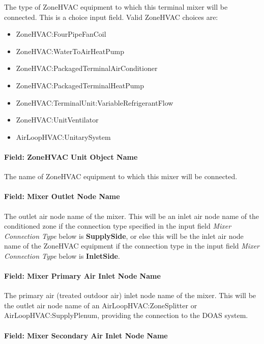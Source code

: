 The type of ZoneHVAC equipment to which this terminal mixer will be connected. This is a choice input field. 
Valid ZoneHVAC choices are:
\begin{itemize}
\setlength{\parskip}{0pt}
\setlength{\itemsep}{0pt plus 1pt}
\item ZoneHVAC:FourPipeFanCoil
\item ZoneHVAC:WaterToAirHeatPump
\item ZoneHVAC:PackagedTerminalAirConditioner
\item ZoneHVAC:PackagedTerminalHeatPump
\item ZoneHVAC:TerminalUnit:VariableRefrigerantFlow
\item ZoneHVAC:UnitVentilator 
\item AirLoopHVAC:UnitarySystem
\end{itemize}

\paragraph{Field: ZoneHVAC Unit Object Name}\label{field-zonehvac-unit-object-name}

The name of ZoneHVAC equipment to which this mixer will be connected.

\paragraph{Field: Mixer Outlet Node Name}\label{field-mixer-outlet-node-name}

The outlet air node name of the mixer. This will be an inlet air node name of the conditioned zone if the connection type specified in the input field \textit{Mixer Connection Type} below is \textbf{SupplySide}, or else this will be the inlet air node name of the ZoneHVAC equipment if the connection type in the input field \textit{Mixer Connection Type} below is \textbf{InletSide}.

\paragraph{Field: Mixer Primary Air Inlet Node Name}\label{field-mixer-primary-air-inlet-node-name}

The primary air (treated outdoor air) inlet node name of the mixer. This will be the outlet air node name of an AirLoopHVAC:ZoneSplitter or AirLoopHVAC:SupplyPlenum, providing the connection to the DOAS system.

\paragraph{Field: Mixer Secondary Air Inlet Node Name}\label{field-mixer-secondary-air-inlet-node-name}

